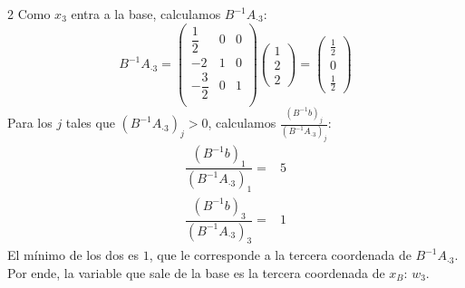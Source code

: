 \documentclass{article}
\newcommand{\binv}{B^{-1}}
\begin{document}
\begin{multicols}{2}
        Como $x_3$ entra a la base, calculamos $\binv A_{\boldsymbol{\cdot} 3}$:
        \[
            \binv A_{\boldsymbol{\cdot} 3} =
            \begin{pmatrix}
                \dfrac{1}{2} & 0 & 0 \\
                -2 & 1 & 0 \\
                -\dfrac{3}{2} & 0 & 1 \\
            \end{pmatrix}
            \begin{pmatrix}
                1 \\ 2 \\ 2
            \end{pmatrix} =
            \begin{pmatrix}
                \frac{1}{2} \\ 0 \\ \frac{1}{2}
            \end{pmatrix}
        \]
        Para los $j$ tales que $(\binv A_{\boldsymbol{\cdot} 3})_j>0$, calculamos $\frac{(\binv b)_j}{(\binv A_{\boldsymbol{\cdot} 3})_j}$:
        \[
            \begin{array}{rl}
                \dfrac{(\binv b)_1}{(\binv A_{\boldsymbol{\cdot} 3})_1} = & 5 \\
                \dfrac{(\binv b)_3}{(\binv A_{\boldsymbol{\cdot} 3})_3} = & 1
            \end{array}
        \]
        El mínimo de los dos es $1$, que le corresponde a la tercera coordenada de $\binv A_{\boldsymbol{\cdot} 3}$.
        Por ende, la variable que sale de la base es la tercera coordenada de $x_B$: $w_3$.
    \end{multicols}
\end{document}
